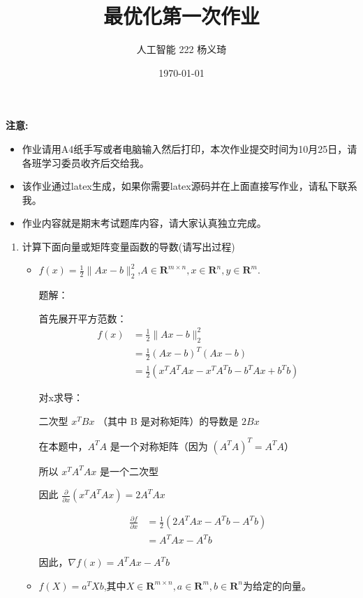 \documentclass[UTF8]{ctexart}
\begin{document}
	\title{最优化第一次作业}
	\author{人工智能 222 杨义琦}
	\date{\today}
	\maketitle


	{\bf 注意:}
	\begin{itemize}
		\item 作业请用A4纸手写或者电脑输入然后打印，本次作业提交时间为10月25日，请各班学习委员收齐后交给我。
		\item 该作业通过latex生成，如果你需要latex源码并在上面直接写作业，请私下联系我。
		\item 作业内容就是期末考试题库内容，请大家认真独立完成。
	\end{itemize}

	\begin{enumerate}
		\item 计算下面向量或矩阵变量函数的导数(请写出过程)
		\begin{itemize}
			\item $f(x)=\frac{1}{2}\|Ax-b\|_2^2$,$A\in\mathbf{R}^{m\times n},x\in\mathbf{R}^n,y\in\mathbf{R}^m$.

			题解：

			首先展开平方范数：
			\begin{align*}
				f(x) &= \frac{1}{2}\|Ax-b\|_2^2 \\
				&= \frac{1}{2}(Ax-b)^T(Ax-b) \\
				&= \frac{1}{2}(x^TA^TAx - x^TA^Tb - b^TAx + b^Tb)
			\end{align*}

			对x求导：

			二次型 $x^TBx$ （其中 B 是对称矩阵）的导数是 $2Bx$

			在本题中，$A^TA$ 是一个对称矩阵（因为 $(A^TA)^T = A^TA$）

			所以 $x^TA^TAx$ 是一个二次型

			因此 $\frac {\partial}{\partial x}(x^TA^TAx) = 2A^TAx$

			\begin{align*}
				\frac{\partial f}{\partial x} &= \frac{1}{2}(2A^TAx - A^Tb - A^Tb) \\
				&= A^TAx - A^Tb
			\end{align*}

			因此，$\nabla f(x) = A^TAx - A^Tb$

			\item $f(X)=a^TXb$,其中$X\in\mathbf{R}^{m\times n},a\in\mathbf{R}^{m},b\in\mathbf{R}^{n}$为给定的向量。


\end{itemize}
\end{enumerate}
\end{document}
